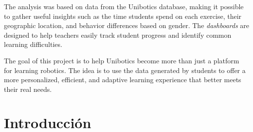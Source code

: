 \documentclass[a4paper, 12pt]{book}
\begin{document}
The analysis was based on data from the Unibotics database, making it possible to gather useful insights such as the time students spend on each exercise, their geographic location, and behavior differences based on gender. The \textit{dashboards}  are designed to help teachers easily track student progress and identify common learning difficulties.

The goal of this project is to help Unibotics become more than just a platform for learning robotics. The idea is to use the data generated by students to offer a more personalized, efficient, and adaptive learning experience that better meets their real needs.





\tableofcontents 
\cleardoublepage
\listoffigures %
\cleardoublepage
\listoflistings


\cleardoublepage
\chapter{Introducción}
\label{sec:intro}
\end{document}
